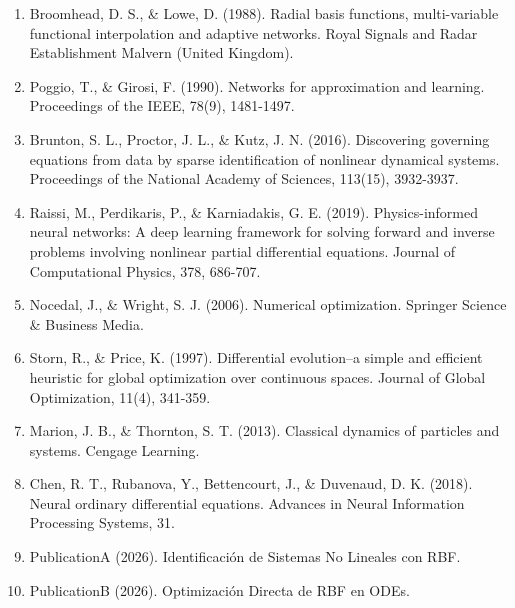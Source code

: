 \documentclass[11pt,a4paper]{article}
\begin{document}
\begin{enumerate}
\item Broomhead, D. S., \& Lowe, D. (1988). Radial basis functions, multi-variable functional interpolation and adaptive networks. Royal Signals and Radar Establishment Malvern (United Kingdom).

\item Poggio, T., \& Girosi, F. (1990). Networks for approximation and learning. Proceedings of the IEEE, 78(9), 1481-1497.

\item Brunton, S. L., Proctor, J. L., \& Kutz, J. N. (2016). Discovering governing equations from data by sparse identification of nonlinear dynamical systems. Proceedings of the National Academy of Sciences, 113(15), 3932-3937.

\item Raissi, M., Perdikaris, P., \& Karniadakis, G. E. (2019). Physics-informed neural networks: A deep learning framework for solving forward and inverse problems involving nonlinear partial differential equations. Journal of Computational Physics, 378, 686-707.

\item Nocedal, J., \& Wright, S. J. (2006). Numerical optimization. Springer Science \& Business Media.

\item Storn, R., \& Price, K. (1997). Differential evolution–a simple and efficient heuristic for global optimization over continuous spaces. Journal of Global Optimization, 11(4), 341-359.

\item Marion, J. B., \& Thornton, S. T. (2013). Classical dynamics of particles and systems. Cengage Learning.

\item Chen, R. T., Rubanova, Y., Bettencourt, J., \& Duvenaud, D. K. (2018). Neural ordinary differential equations. Advances in Neural Information Processing Systems, 31.

\item PublicationA (2026). Identificación de Sistemas No Lineales con RBF.

\item PublicationB (2026). Optimización Directa de RBF en ODEs.
\end{enumerate}
\end{document}
